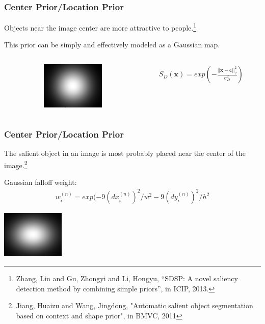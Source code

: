 \documentclass[notheorems,serif,table,compress]{beamer}  %
\begin{document}
\begin{frame}
\frametitle{Center Prior/Location Prior}
{\color{blue}Objects near the image center are more attractive to people.}\footnote{Zhang, Lin and Gu, Zhongyi and Li, Hongyu, ``SDSP: A novel saliency detection method by combining simple priors'', in ICIP, 2013.}

\vspace{0.15in}

This prior can be simply and effectively modeled as a Gaussian map.

\vspace{0.15in}

\begin{columns}
\begin{column}{\leftmargini}
\end{column}
\hspace{-1in}
\begin{column}{0.1\linewidth}
\centering\includegraphics[width=3cm]{CenterPrior}
\end{column}
\begin{column}{0.7\linewidth}
\begin{align}
S_D(\textbf{x}) = exp\left(-\frac{||\textbf{x}-\textbf{c}||_2^2}{\sigma_D^2}\right)
\end{align}
\end{column}
\end{columns}\vspace{1ex}
\vspace{-0.4in}
\end{frame}


\begin{frame}
\frametitle{Center Prior/Location Prior}
{\color{blue}The salient object in an image is most probably placed near the center of the image.}\footnote{Jiang, Huaizu and Wang, Jingdong, "Automatic salient object segmentation based on context and shape prior", in BMVC, 2011}

\vspace{0.2in}

Gaussian falloff weight:
\begin{align}
w_i^{(n)} = exp(-9(dx_i^{(n)})^2/w^2-9(dy_i^{(n)})^2/h^2
\end{align}

\centering\includegraphics[width=3cm]{CBcolorPrior.png}
\end{frame}
\end{document}
